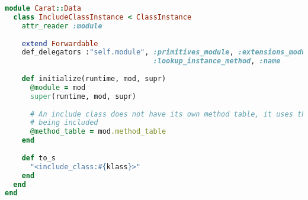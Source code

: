 \begin{lstlisting}[title={\small\Helvetica data/include\_class.rb},language=Ruby]
module Carat::Data
  class IncludeClassInstance < ClassInstance
    attr_reader :module
    
    extend Forwardable
    def_delegators :"self.module", :primitives_module, :extensions_module,
                                   :lookup_instance_method, :name
    
    def initialize(runtime, mod, supr)
      @module = mod
      super(runtime, mod, supr)
      
      # An include class does not have its own method table, it uses the method table of the module
      # being included
      @method_table = mod.method_table
    end
    
    def to_s
      "<include_class:#{klass}>"
    end
  end
end

\end{lstlisting}

